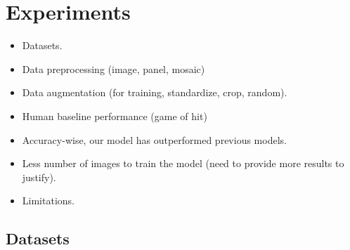 \section{Experiments}

{
\color{gray} 

\begin{itemize}

    \item Datasets.

    \item Data preprocessing (image, panel, mosaic)

    \item Data augmentation (for training, standardize, crop, random).

    \item Human baseline performance (game of hit)

    \item Accuracy-wise, our model has outperformed previous models.  

    \item Less number of images to train the model (need to provide more results
    to justify).  

    \item Limitations.

\end{itemize}

}


\subsection{Datasets}


